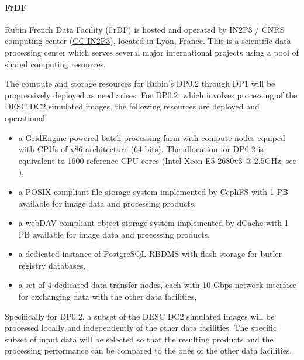 \paragraph{FrDF}

Rubin French Data Facility (FrDF) is hosted and operated by IN2P3 / CNRS
computing center (\href{https://cc.in2p3.fr/en/}{CC-IN2P3}),
located in Lyon, France. This is a scientific data processing center which
serves several major international projects using a pool of shared computing
resources.

The compute and storage resources for Rubin's DP0.2 through DP1 will be
progressively deployed as need arises. For DP0.2, which involves processing of
the DESC DC2 simulated images, the following resources are deployed and
operational:

\begin{itemize}
\item a GridEngine-powered batch processing farm with compute nodes equiped
with CPUs of x86 architecture (64 bits). The allocation for DP0.2 is equivalent
to 1600 reference CPU cores (Intel Xeon E5-2680v3 @ 2.5GHz, see 
),
\item a POSIX-compliant file storage system implemented by 
\href{https://docs.ceph.com/en/latest/cephfs/index.html}{CephFS} with 1 PB 
available for image data and processing products,
\item a webDAV-compliant object storage system implemented by 
\href{https://www.dcache.org}{dCache} with 1 PB available for image data and
processing products,
\item a dedicated instance of PostgreSQL RBDMS with flash storage for butler
registry databases,
\item a set of 4 dedicated data transfer nodes, each with 10 Gbps network
interface for exchanging data with the other data facilities,
\end{itemize}

Specifically for DP0.2, a subset of the DESC DC2 simulated images will be
processed locally and independently of the other data facilities. The specific
subset of input data will be selected so that the resulting products and the
processing performance can be compared to the ones of the other data facilities.